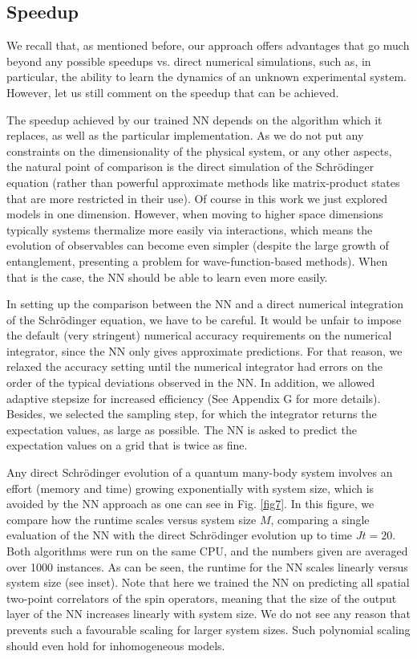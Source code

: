 \documentclass[a4paper,aps,amsmath,amssymb,twocolumn,longbibliography,,accepted=2022-05-17]{quantumarticle}
\begin{document}
\subsection{Speedup}


We recall that, as mentioned before, our approach offers advantages that go much beyond any possible speedups vs. direct numerical simulations, such as, in particular, the ability to learn the dynamics of an unknown experimental system. However, let us still comment on the speedup that can be achieved. 

The speedup achieved by our trained NN depends on the algorithm which it replaces, as well as the particular implementation. As we do not put any constraints on the dimensionality of the physical system, or any other aspects, the natural point of comparison is the direct simulation of the Schr\"odinger equation (rather than powerful approximate methods like matrix-product states that are more restricted in their use). Of course in this work we just explored models in one dimension. However, when moving to higher space dimensions typically systems thermalize more easily via interactions, which means the evolution of observables can become even simpler (despite the large growth of entanglement, presenting a problem for wave-function-based methods). When that is the case, the NN should be able to learn even more easily.


In setting up the comparison between the NN and a direct numerical integration of the Schr\"odinger equation, we have to be careful. It would be unfair to impose the default (very stringent) numerical accuracy requirements on the numerical integrator, since the NN only gives approximate predictions. For that reason, we relaxed the accuracy setting until the numerical integrator had errors on the order of the typical deviations observed in the NN. In addition, we allowed adaptive stepsize for increased efficiency (See Appendix G for more details). Besides, we selected the sampling step, for which the integrator returns the expectation values, as large as possible. The NN  is asked to predict the expectation values on a grid that is twice as fine.

Any direct Schr\"odinger evolution of a quantum many-body system involves an effort (memory and time) growing exponentially with system size, which is avoided by the NN approach as one can see in Fig. \ref{fig7}. In this figure, we compare how the runtime scales versus system size $M$, comparing a single evaluation of the NN with the direct Schr\"odinger evolution up to time $Jt=20$. Both algorithms were run on the same CPU, and the numbers given are averaged over 1000 instances.  As can be seen, the runtime  for the NN scales linearly versus system size (see inset). Note that here we trained the NN on predicting all spatial two-point correlators of the spin operators, meaning that the size of the output layer of the NN increases linearly with system size. We do not see any reason that prevents such a favourable scaling for larger system sizes. Such polynomial scaling should even hold for inhomogeneous models. 
\end{document}
